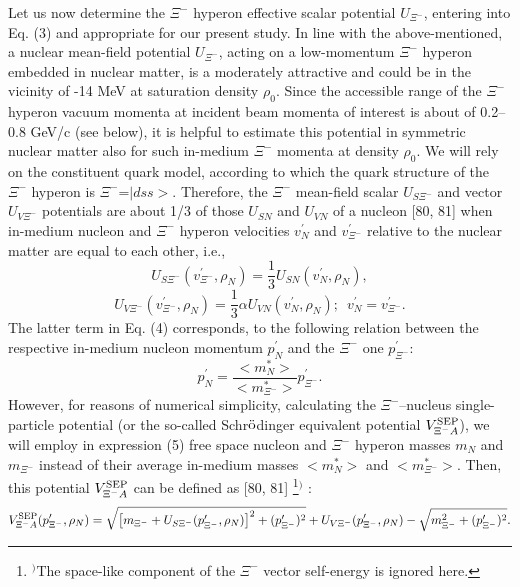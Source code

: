 \documentclass[12pt]{article}
\begin{document}
Let us now determine the $\Xi^-$ hyperon effective scalar potential $U_{\Xi^-}$, entering into Eq. (3) and
appropriate for our present study. In line with the above-mentioned, a nuclear mean-field potential
$U_{\Xi^-}$, acting on a low-momentum $\Xi^-$ hyperon embedded in nuclear matter, is a moderately
attractive and could be in the vicinity of -14 MeV at saturation density $\rho_0$.
Since the accessible range of the $\Xi^-$
hyperon vacuum momenta at incident beam momenta of interest is about of 0.2--0.8 GeV/c (see below),
it is helpful to estimate this potential in symmetric nuclear matter also for such in-medium $\Xi^-$ momenta
at density $\rho_0$. We will rely on the constituent quark model, according to which the quark structure
of the $\Xi^-$ hyperon is $\Xi^-$=$|dss>$. Therefore, the $\Xi^-$ mean-field scalar
$U_{S{\Xi^-}}$ and vector $U_{V{\Xi^-}}$ potentials are about 1/3 of those
$U_{SN}$ and $U_{VN}$ of a nucleon [80, 81] when in-medium nucleon and $\Xi^-$ hyperon velocities
$v^{\prime}_N$ and $v^{\prime}_{\Xi^-}$ relative to the nuclear matter are equal to each other, i.e.,
$$
U_{S{\Xi^-}}(v^{\prime}_{\Xi^-},\rho_N)=\frac{1}{3}U_{SN}(v^{\prime}_{N},\rho_N),
$$
\begin{equation}
U_{V{\Xi^-}}(v^{\prime}_{\Xi^-},\rho_N)=\frac{1}{3}{\alpha}U_{VN}(v^{\prime}_{N},\rho_N);\,\,\,
v^{\prime}_{N}=v^{\prime}_{\Xi^-}.
\end{equation}
The latter term in Eq. (4) corresponds, to the following relation between
the respective in-medium nucleon momentum $p^{\prime}_N$ and the $\Xi^-$ one $p^{\prime}_{\Xi^-}$:
\begin{equation}
p^{\prime}_{N}=\frac{<m^*_{N}>}{<m^*_{\Xi^-}>}p^{\prime}_{\Xi^-}.
\end{equation}
However, for reasons of numerical simplicity, calculating the $\Xi^-$--nucleus single-particle potential
(or the so-called Schr${\ddot{\rm o}}$dinger equivalent potential $V_{{\Xi^-}A}^{\rm SEP}$), we will
employ in expression (5) free space nucleon and $\Xi^-$ hyperon masses $m_N$ and $m_{\Xi^-}$ instead of
their average in-medium masses $<m^*_{N}>$ and $<m^*_{\Xi^-}>$.
Then, this potential $V_{{\Xi^-}A}^{\rm SEP}$ can be
defined as [80, 81]
\footnote{$^)$The space-like component of the $\Xi^-$ vector self-energy is ignored here.}$^)$
:
\begin{equation}
V_{{\Xi^-}A}^{\rm SEP}(p^{\prime}_{\Xi^-},\rho_N)=
\sqrt{\left[m_{\Xi^-}+U_{S{\Xi^-}}(p^{\prime}_{\Xi^-},\rho_N)\right]^2+({p^{\prime}_{\Xi^-}})^2}
+U_{V{\Xi^-}}(p^{\prime}_{\Xi^-},\rho_N)-\sqrt{m_{\Xi^-}^2+({p^{\prime}_{\Xi^-}})^2}.
\end{equation}
\end{document}
